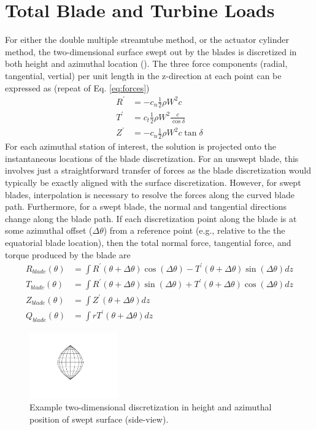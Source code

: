 \documentclass{article}
\begin{document}
\section{Total Blade and Turbine Loads}
For either the double multiple streamtube method, or the actuator cylinder method, the two-dimensional surface swept out by the blades is discretized in both height and azimuthal location ().  The three force components (radial, tangential, vertial) per unit length in the z-direction at each point can be expressed as (repeat of Eq. \eqref{eq:forces})
\begin{equation}
\begin{aligned}
  R^\prime &= -c_n \frac{1}{2} \rho W^2 c \\
  T^\prime &= c_t \frac{1}{2}\rho W^2 \frac{c}{\cos\delta } \\
  Z^\prime &= -c_n\frac{1}{2}\rho W^2 c \tan\delta
\end{aligned}
\end{equation}
 For each azimuthal station of interest, the solution is projected onto the instantaneous locations of the blade discretization.  For an unswept blade, this involves just a straightforward transfer of forces as the blade discretization would typically be exactly aligned with the surface discretization.  However, for swept blades, interpolation is necessary to resolve the forces along the curved blade path.  Furthermore, for a swept blade, the normal and tangential directions change along the blade path.  If each discretization point along the blade is at some azimuthal offset ($\Delta \theta$) from a reference point (e.g., relative to the the equatorial blade location), then the total normal force, tangential force, and torque produced by the blade are
\begin{equation}
\begin{aligned}
  R_{blade}(\theta) &= \int R^\prime(\theta + \Delta\theta) \cos(\Delta \theta) - T^\prime(\theta + \Delta\theta) \sin(\Delta \theta) dz \\
  T_{blade}(\theta) &= \int R^\prime(\theta + \Delta\theta) \sin(\Delta \theta) + T^\prime(\theta + \Delta\theta) \cos(\Delta \theta) dz \\
  Z_{blade}(\theta) &= \int Z^\prime(\theta + \Delta\theta) dz \\
  Q_{blade}(\theta) &= \int r T^\prime(\theta + \Delta\theta) dz
\end{aligned}
\end{equation}

\begin{figure}[htbp]
\begin{center}
\includegraphics[width=1.5in]{images/grid}
\caption{Example two-dimensional discretization in height and azimuthal position of swept surface (side-view).}
\label{fig:grid}
\end{center}
\end{figure}
\end{document}
